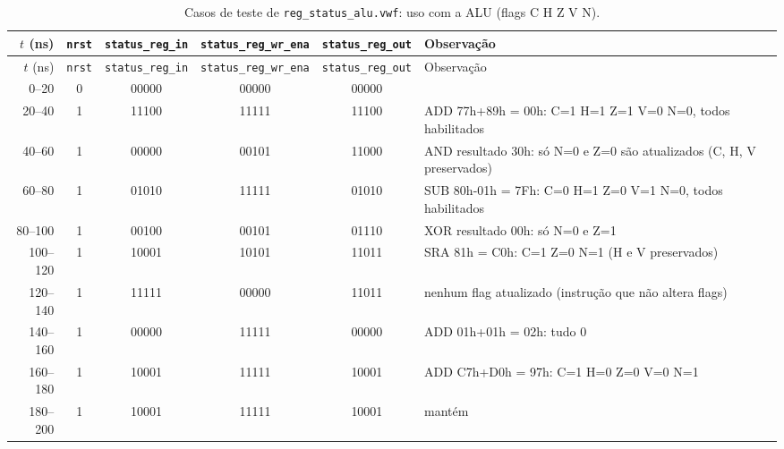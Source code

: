 {\scriptsize\setlength{\tabcolsep}{3pt}
\begin{longtable}{rccccp{4.4cm}}
\caption{Casos de teste de \texttt{reg\_status\_alu.vwf}: uso com a ALU (flags C H Z V N).}
\label{tab:caso-reg-status-alu}\\
\hline $t$ (ns) & \texttt{nrst} & \texttt{status\_reg\_in} & \texttt{status\_reg\_wr\_ena} & \texttt{status\_reg\_out} & Observação \\ \hline \endfirsthead
\hline $t$ (ns) & \texttt{nrst} & \texttt{status\_reg\_in} & \texttt{status\_reg\_wr\_ena} & \texttt{status\_reg\_out} & Observação \\ \hline \endhead
0--20 & 0 & 00000 & 00000 & 00000 &  \\
20--40 & 1 & 11100 & 11111 & 11100 & ADD 77h+89h = 00h: C=1 H=1 Z=1 V=0 N=0, todos habilitados \\
40--60 & 1 & 00000 & 00101 & 11000 & AND resultado 30h: só N=0 e Z=0 são atualizados (C, H, V preservados) \\
60--80 & 1 & 01010 & 11111 & 01010 & SUB 80h-01h = 7Fh: C=0 H=1 Z=0 V=1 N=0, todos habilitados \\
80--100 & 1 & 00100 & 00101 & 01110 & XOR resultado 00h: só N=0 e Z=1 \\
100--120 & 1 & 10001 & 10101 & 11011 & SRA 81h = C0h: C=1 Z=0 N=1 (H e V preservados) \\
120--140 & 1 & 11111 & 00000 & 11011 & nenhum flag atualizado (instrução que não altera flags) \\
140--160 & 1 & 00000 & 11111 & 00000 & ADD 01h+01h = 02h: tudo 0 \\
160--180 & 1 & 10001 & 11111 & 10001 & ADD C7h+D0h = 97h: C=1 H=0 Z=0 V=0 N=1 \\
180--200 & 1 & 10001 & 11111 & 10001 & mantém \\
\hline
\end{longtable}}
\vspace{-0.9cm}
